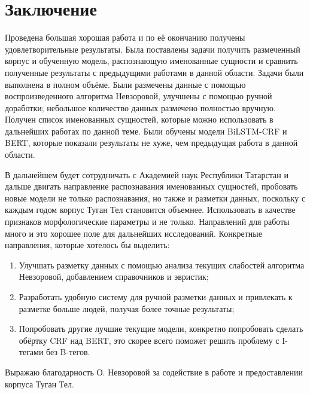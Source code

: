\section{Заключение}

Проведена большая хорошая работа и по её окончанию получены удовлетворительные результаты. Была поставлены задачи получить размеченный корпус и обученную модель, распознающую именованные сущности и сравнить полученные результаты с предыдущими работами в данной области. Задачи были выполнена в полном объёме. Были размечены данные с помощью воспроизведенного алгоритма Невзоровой, улучшены с помощью ручной доработки; небольшое количество данных размечено полностью вручную. Получен список именованных сущностей, которые можно использовать в дальнейших работах по данной теме. Были обучены модели BiLSTM-CRF и BERT, которые показали результаты не хуже, чем предыдущая работа в данной области. 

В дальнейшем будет сотрудничать с Академией наук Республики Татарстан и дальше двигать направление распознавания именованных сущностей, пробовать новые модели не только распознавания, но также и разметки данных, поскольку с каждым годом корпус Туган Тел становится объемнее. Использовать в качестве признаков морфологические параметры и не только. Направлений для работы много и это хорошее поле для дальнейших исследований. Конкретные направления, которые хотелось бы выделить:

\begin{enumerate}
\item Улучшать разметку данных с помощью анализа текущих слабостей алгоритма Невзоровой, добавлением справочников и эвристик; 
\item Разработать удобную систему для ручной разметки данных и привлекать к разметке больше людей, получая более точные результаты;
\item Попробовать другие лучшие текущие модели, конкретно попробовать сделать обёртку CRF над BERT, это скорее всего поможет решить проблему с I-тегами без B-тегов.
\end{enumerate}

Выражаю благодарность О. Невзоровой за содействие в работе и предоставлении корпуса Туган Тел.